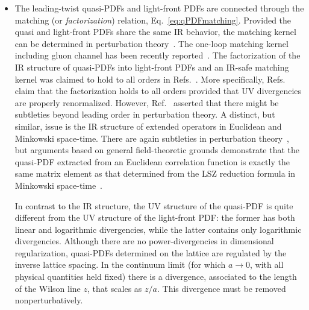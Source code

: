 \begin{itemize}
\item The leading-twist quasi-PDFs and light-front PDFs are connected through 
the matching (or {\it factorization}) relation, Eq.~\eqref{eq:qPDFmatching}. 
%
Provided the quasi and light-front PDFs share the same IR behavior, the 
matching kernel can be determined in perturbation theory~\cite{Xiong:2013bka}. 
%
The one-loop matching kernel including gluon channel has been recently 
reported~\cite{Wang:2017qyg}.
%
The factorization of the IR structure of quasi-PDFs into light-front PDFs and an IR-safe matching kernel was claimed to hold to all orders in Refs.~\cite{Ma:2014jla,Ma:2014jga,Ma:2017pxb}.
%
More specifically, Refs.~\cite{Ma:2014jla,Ma:2014jga} claim that the 
factorization holds to all orders provided that UV divergencies 
are properly renormalized.
%
However, Ref.~\cite{Li:2016amo} asserted that there might be subtleties beyond 
leading order in perturbation theory. 
%
A distinct, but similar, issue is the IR structure of extended operators in 
Euclidean and Minkowski space-time. 
%
There are again subtleties in perturbation theory~\cite{Carlson:2017gpk}, 
but arguments based on general field-theoretic grounds demonstrate that the 
quasi-PDF extracted from an Euclidean correlation function is exactly the 
same matrix element as that determined from the LSZ reduction formula in 
Minkowski space-time~\cite{Briceno:2017cpo}.

In contrast to the IR structure, the UV structure of the quasi-PDF is quite 
different from the UV structure of the light-front PDF: the former has both 
linear and logarithmic divergencies, while the latter contains only logarithmic 
divergencies. 
%
Although there are no power-divergencies in dimensional regularization, 
quasi-PDFs determined on the lattice are regulated by the inverse lattice 
spacing. 
%
In the continuum limit (for which $a\to 0$, with all physical quantities held 
fixed) there is a divergence, associated to the length of the Wilson line $z$, 
that scales as $z/a$. This divergence must be removed nonperturbatively.


\end{itemize}
